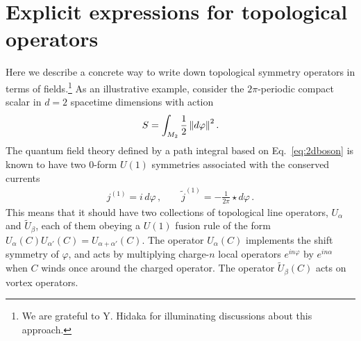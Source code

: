 \documentclass[11pt]{article}
\newcommand{\formabs}[1]{\left\Arrowvert #1 \right\Arrowvert}
\begin{document}
\appendix
\section{Explicit expressions for topological operators}
\label{sec:appendix}
Here we describe a concrete way to write down topological symmetry operators in terms of fields.\footnote{We are grateful to Y. Hidaka for illuminating discussions about this approach.} As an illustrative example, consider the $2\pi$-periodic compact scalar in $d=2$ spacetime dimensions with action
\begin{equation}\label{eq:2dboson}
S = \int_{M_2} \frac{1}{2}\formabs{d\varphi}^2.
\end{equation}
The quantum field theory defined by a path integral based on Eq.~\eqref{eq:2dboson} is known to have two $0$-form $U(1)$ symmetries associated with the conserved currents
\begin{align}
j^{(1)} = i\, d\varphi\,, \qquad     \tilde{j}^{(1)} = -\frac{1}{2\pi}\star d\varphi \,.
\label{eq:standard_scalar_currents}
\end{align}
This means that it should have two collections of topological line operators, $U_{\alpha}$ and $\tilde{U}_{\beta}$, each of them obeying  a $U(1)$ fusion rule of the form $U_{\alpha}(C) U_{\alpha'}(C) = U_{\alpha+\alpha'}(C)$. The operator $U_{\alpha}(C)$ implements the shift symmetry of $\varphi$, and acts by multiplying charge-$n$ local operators $e^{i n \varphi}$ by $e^{in\alpha}$ when $C$ winds once around the charged operator.  The operator $\tilde{U}_{\beta}(C)$ acts on vortex operators.
\end{document}
